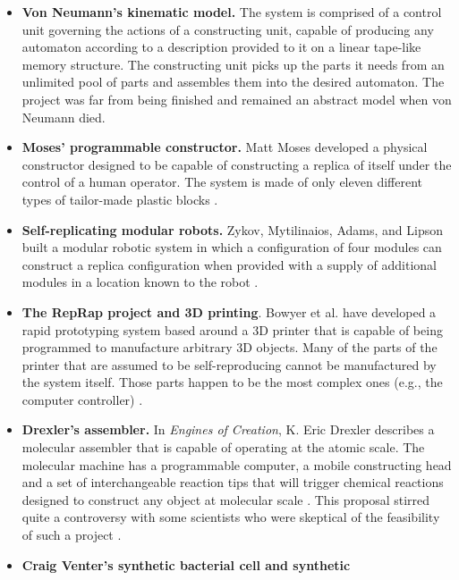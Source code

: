 \begin{itemize}
\item \textbf{Von Neumann’s kinematic model.} The system is comprised of a
control unit governing the actions of a constructing unit, capable of
producing any automaton according to a description provided to it on a
linear tape-like memory structure. The constructing unit picks up the
parts it needs from an unlimited pool of parts and assembles them into
the desired automaton. The project was far from being finished and
remained an abstract model when von Neumann died.\citep{stevens2009}
\item \textbf{Moses' programmable constructor.} Matt Moses developed a physical constructor designed to be
capable of constructing a replica of itself under the control of a
human operator. The system is made of only eleven different types of
tailor-made plastic blocks \citep{moses2001}.
\item \textbf{Self-replicating modular robots.} Zykov, Mytilinaios,
Adams, and Lipson built a modular robotic system in which a
configuration of four modules can construct a replica configuration
when provided with a supply of additional modules in a location known
to the robot .
\item \textbf{The RepRap project and 3D printing}. Bowyer et al. have
developed a rapid prototyping system based around a 3D printer that is
capable of being programmed to manufacture arbitrary 3D objects. Many
of the parts of the printer that are assumed to be self-reproducing
cannot be manufactured by the system itself.  Those parts happen to be the
most complex ones (e.g., the computer controller) \citep{bowyer2007}.
\item \textbf{Drexler's assembler.} In \textit{Engines of Creation}, K. Eric
Drexler describes a molecular assembler that is capable of operating at
the atomic scale. The molecular machine has a programmable computer, a
mobile constructing head and a set of interchangeable reaction tips
that will trigger chemical reactions designed to construct any object
at molecular scale \citep{drexler1986}.
This proposal stirred quite a controversy with some
scientists who were skeptical of the feasibility of such a project \citep{smalley2001}.
\item \textbf{Craig Venter's synthetic bacterial cell and synthetic
}
\end{itemize}
